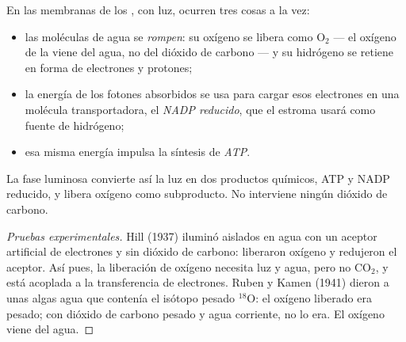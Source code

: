 \begin{proposition}\label{prop:g12:photosynthesis:lightphase}
En las membranas de los , con luz, ocurren tres cosas a la
vez:
\begin{itemize}
  \item las moléculas de agua se \emph{rompen}: su oxígeno se libera
        como $\mathrm{O_2}$ --- el oxígeno de la  viene del
        agua, no del dióxido de carbono --- y su hidrógeno se retiene
        en forma de electrones y protones;
  \item la energía de los fotones absorbidos se usa para cargar esos
        electrones en una molécula transportadora, el \emph{NADP
        reducido}, que el estroma usará como fuente de hidrógeno;
  \item esa misma energía impulsa la síntesis de \emph{ATP}.
\end{itemize}
La fase luminosa convierte así la luz en dos productos químicos, ATP y
NADP reducido, y libera oxígeno como subproducto. No interviene ningún
dióxido de carbono.
\end{proposition}
\begin{proof}[Pruebas experimentales]
Hill (1937) iluminó  aislados en agua con un aceptor
artificial de electrones y sin dióxido de carbono: liberaron oxígeno y
redujeron el aceptor. Así pues, la liberación de oxígeno necesita luz y
agua, pero no $\mathrm{CO_2}$, y está acoplada a la transferencia de
electrones. Ruben y Kamen (1941) dieron a unas algas agua que contenía
el isótopo pesado $^{18}$O: el oxígeno liberado era pesado; con dióxido
de carbono pesado y agua corriente, no lo era. El oxígeno viene del
agua.
\end{proof}

